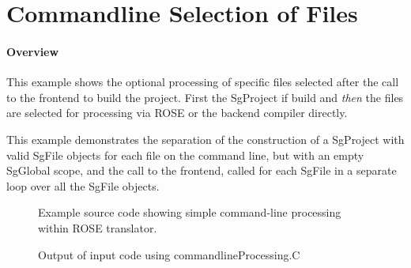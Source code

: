 \section{Commandline Selection of Files}

\paragraph{Overview} This example shows the optional processing of specific files selected
after the call to the frontend to build the project.  First the SgProject if build and
{\em then} the files are selected for processing via ROSE or the backend compiler
directly.

   This example demonstrates the separation of the construction of a SgProject with
valid SgFile objects for each file on the command line, but with an empty SgGlobal scope,
and the call to the frontend, called for each SgFile in a separate loop over all the 
SgFile objects.

\begin{figure}[!h]
{\indent
{\mySmallFontSize

\label{Tutorial:exampleCommandlineProcessing}

\begin{latexonly}
   
\end{latexonly}

\begin{htmlonly}
   
\end{htmlonly}

}
}
\caption{Example source code showing simple command-line processing within ROSE translator.}
\end{figure}


\begin{figure}[!h]
{\indent
{\mySmallFontSize

\label{Tutorial:exampleOutput_CommandlineProcessing}

\begin{latexonly}
   
\end{latexonly}

\begin{htmlonly}
   
\end{htmlonly}

}
}
\caption{Output of input code using commandlineProcessing.C}
\end{figure}




